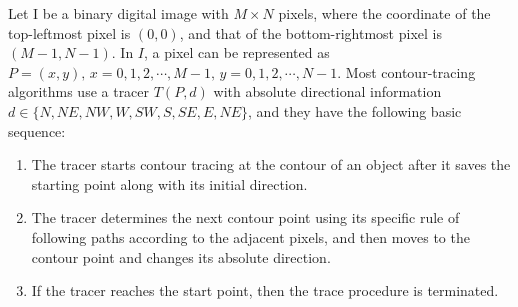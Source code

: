 
Let I be a binary digital image with $M \times N$ pixels, where the coordinate of the top-leftmost pixel is $(0, 0)$, and that of the bottom-rightmost pixel is $(M - 1, N - 1)$. In $I$, a pixel can be represented as $P = (x, y),\, x = 0,1,2,\cdots,M-1,\, y = 0,1,2,\cdots, N-1$. Most contour-tracing algorithms use a tracer $T (P, d)$ with absolute directional information $d\in\{N,NE,NW,W,SW,S,SE,E,NE\}$, and they have the following basic sequence: 


\begin{enumerate}
\item The tracer starts contour tracing at the contour of an object after it saves the starting point along with its initial direction. 
\item The tracer determines the next contour point using its specific rule of following paths according to the adjacent pixels, and then moves to the contour point and changes its absolute direction.
\item If the tracer reaches the start point, then the trace procedure is terminated. 
\end{enumerate}


